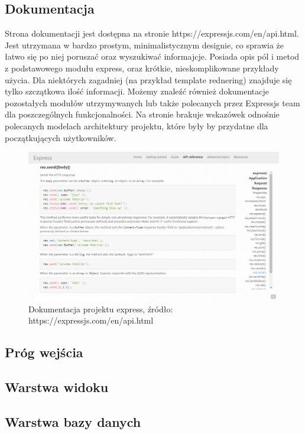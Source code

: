 \documentclass[12pt]{report}
\begin{document}
    \subsection{Dokumentacja}
      Strona dokumentacji jest dostępna na stronie https://expressjs.com/en/api.html.
      Jest utrzymana w bardzo prostym, minimalistycznym designie, co sprawia że łatwo się po niej poruszać oraz wyszukiwać informajcje.
      Posiada opis pól i metod z podstawowego modułu express, oraz krótkie, nieskomplikowane przykłady użycia.
      Dla niektórych zagadniej (na przykład template rednering) znajduje się tylko szczątkowa ilość informacji.
      Możemy znaleźć również dokumentacje pozostałych modułów utrzymywanych lub także polecanych przez Expressjs team dla poszczególnych funkcjonalności.
      Na stronie brakuje wskazówek odnośnie polecanych modelach architektury projektu, które były by przydatne dla początkujących użytkowników.
      \begin{figure}[!hb]
        \centering
        \includegraphics[width=\textwidth,height=\textheight,keepaspectratio]{doc_express.png} 
        \caption{Dokumentacja projektu express, źródło: https://expressjs.com/en/api.html}
      \end{figure}

    \subsection{Próg wejścia}
    \subsection{Warstwa widoku}
    \subsection{Warstwa bazy danych}
\end{document}
